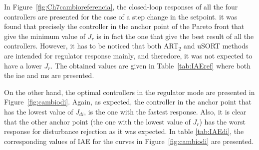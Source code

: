 In Figure~\ref{fig:Ch7cambioreferencia}, the closed-loop responses of all the four controllers are presented for the case of a step change in the setpoint. it was found that precisely the controller in the anchor point of the Pareto front that give the minimum value of $J_r$ is in fact the one that give the best result of all the controllers. However, it has to be noticed that both ART$_2$ and uSORT methods are intended for regulator response mainly, and theredore, it was not expected to have a lower $J_r$. The obtained values are given in Table~\ref{tab:IAEref} where both the \gls{iae} and \gls{ms} are presented. 

On the other hand, the optimal controllers in the regulator mode are presented in Figure~\ref{fig:cambiodi}. Again, as expected, the controller in the anchor point that has the lowest value of $J_{di}$, is the one with the fastest response. Also, it is clear that the other anchor point (the one with the lowest value of $J_r$) has the worst response for disturbance rejection as it was expected. In table \ref{tab:IAEdi}, the corresponding values of IAE for the curves in Figure~\ref{fig:cambiodi} are presented.

